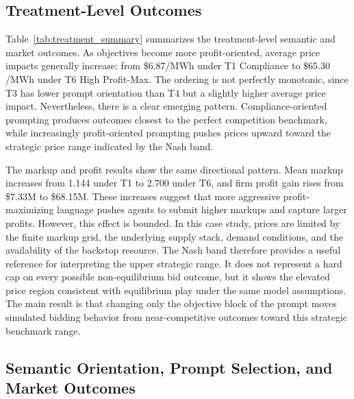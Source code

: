 \subsection{Treatment-Level Outcomes}

Table~\ref{tab:treatment_summary} summarizes the treatment-level semantic and market outcomes. As objectives become more profit-oriented, average price impacts generally increase: from $\$6.87$/MWh under T1 Compliance to $\$65.30$/MWh under T6 High Profit-Max. The ordering is not perfectly monotonic, since T3 has lower prompt orientation than T4 but a slightly higher average price impact. Nevertheless, there is a clear emerging pattern. Compliance-oriented prompting produces outcomes closest to the perfect competition benchmark, while increasingly profit-oriented prompting pushes prices upward toward the strategic price range indicated by the Nash band.

The markup and profit results show the same directional pattern. Mean markup increases from 1.144 under T1 to 2.700 under T6, and firm profit gain rises from \$7.33M to \$68.15M. These increases suggest that more aggressive profit-maximizing language pushes agents to submit higher markups and capture larger profits. However, this effect is bounded. In this case study, prices are limited by the finite markup grid, the underlying supply stack, demand conditions, and the availability of the backstop resource. The Nash band therefore provides a useful reference for interpreting the upper strategic range. It does not represent a hard cap on every possible non-equilibrium bid outcome, but it shows the elevated price region consistent with equilibrium play under the same model assumptions. The main result is that changing only the objective block of the prompt moves simulated bidding behavior from near-competitive outcomes toward this strategic benchmark range.


\subsection{Semantic Orientation, Prompt Selection, and Market Outcomes}

